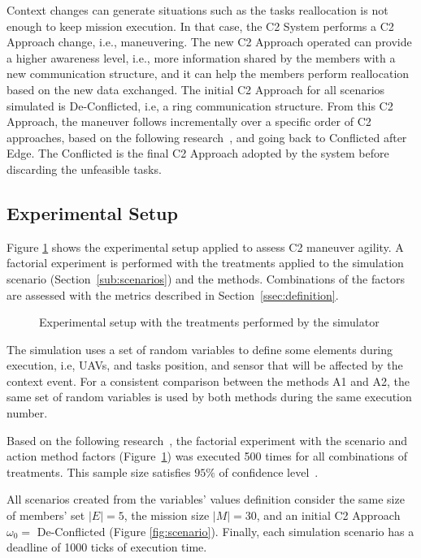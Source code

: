Context changes can generate situations such as the tasks reallocation is not enough to keep mission execution. In that case, the C2 System performs a C2 Approach change, i.e., maneuvering. The new C2 Approach operated can provide a higher awareness level, i.e., more information shared by the members with a new communication structure, and it can help the members perform reallocation based on the new data exchanged. The initial C2 Approach for all scenarios simulated is De-Conflicted, i.e, a ring communication structure. From this C2 Approach, the maneuver follows incrementally over a specific order of C2 approaches, based on the following research~\cite{france2014}, and going back to Conflicted after Edge. The Conflicted is the final C2 Approach adopted by the system before discarding the unfeasible tasks.

\subsection{Experimental Setup}
\label{sub:setup}

Figure \ref{fig:exp_setup} shows the experimental setup applied to assess C2 maneuver agility. A factorial experiment is performed with the treatments applied to the simulation scenario (Section~\ref{sub:scenarios}) and the methods. Combinations of the factors are assessed with the metrics described in Section~\ref{ssec:definition}.

\begin{figure}[ht!]
    \centering
    \scalebox{.65}{}
    \caption{Experimental setup with the treatments performed by the simulator}
    \label{fig:exp_setup}
\end{figure}

The simulation uses a set of random variables to define some elements during execution, i.e, UAVs, and tasks position, and sensor that will be affected by the context event. For a consistent comparison between the methods A1 and A2, the same set of random variables is used by both methods during the same execution number.

Based on the following research~\cite{CochranW.G.1983}, the factorial experiment with the scenario and action method factors (Figure~\ref{fig:exp_setup}) was executed 500 times for all combinations of treatments. This sample size satisfies $95\%$ of confidence level~\cite{CochranW.G.1983}.

All scenarios created from the variables' values definition consider the same size of members' set $|E|=5$, the mission size $|M|=30$, and an initial C2 Approach $\omega_0 =$ De-Conflicted (Figure \ref{fig:scenario}). Finally, each simulation scenario has a deadline of 1000 ticks of execution time.

